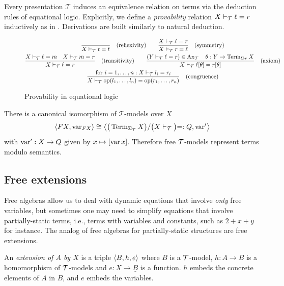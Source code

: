 Every presentation $\mathcal T$ induces an equivalence relation on terms via the deduction rules of equational logic. Explicitly, we define a \emph{provability} relation $X \vdash_{\mathcal{T}} \ell = r$ inductively as in . Derivations are built similarly to natural deduction.
\begin{figure}[!h]
  \begin{gather*}
    \dfrac{}{X \vdash_{\mathcal{T}} t = t} \quad (\text{reflexivity}) \qquad \dfrac{X \vdash_{\mathcal{T}} \ell = r}{X \vdash_{\mathcal{T}} r = \ell} \quad (\text{symmetry})\\
    \dfrac{X \vdash_{\mathcal{T}} \ell = m \quad X \vdash_{\mathcal{T}} m = r}{X \vdash_{\mathcal{T}} \ell = r} \quad (\text{transitivity}) \qquad \dfrac{(Y \vdash_{\mathcal{T}} \ell = r) \in \operatorname{Ax}_{\mathcal{T}} \quad \theta : Y \to \operatorname{Term}_{\Sigma_\mathcal{T}} X}{X \vdash_{\mathcal{T}} \ell[\theta] = r[\theta]} \quad (\text{axiom})\\
    \dfrac{\text{for } i = 1, \dots, n: X \vdash_{\mathcal{T}} l_i = r_i}{X \vdash_{\mathcal{T}} \operatorname{op}(l_1, \dots, l_n) = \operatorname{op}(r_1, \dots, r_n)} \quad (\text{congruence})
  \end{gather*}
  \caption{Provability in equational logic}
  \label{fig:provability}
\end{figure}

There is a canonical isomorphism of $\mathcal{T}$-models over $X$ $$\left\langle FX, \operatorname{var}_{FX} \right\rangle \cong \left\langle \bigr(\operatorname{Term}_{\Sigma_{\mathcal{T}}} X \bigl) / \bigr(X \vdash_{\mathcal{T}}\bigl) =: Q, \operatorname{var}' \right\rangle$$ with $\operatorname{var}': {X} \to {Q}$ given by ${x} \mapsto {[\operatorname{var}x]}$. Therefore free $\mathcal{T}$-models represent terms modulo semantics.

\subsection{Free extensions}
\label{sec:free_extensions}

Free algebras allow us to deal with dynamic equations that involve \emph{only} free variables, but sometimes one may need to simplify equations that involve partially-static terms, i.e., terms with variables and constants, such as $2 + x + y$ for instance. The analog of free algebras for partially-static structures are free extensions.

An \emph{extension of $A$ by $X$} is a triple $\left\langle B, h, e \right\rangle$ where $B$ is a $\mathcal T$-model, $h : A \to B$ is a homomorphism of $\mathcal{T}$-models and $e : X \to \underline B$ is a function. $h$ embeds the concrete elements of $A$ in $B$, and $e$ embeds the variables.

